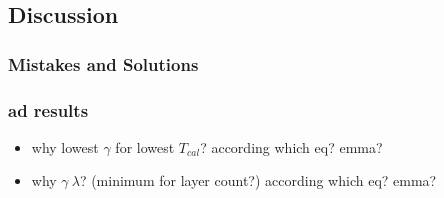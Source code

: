 \subsection{Discussion}
\subsubsection{Mistakes and Solutions}
\subsubsection{ad results}
\begin{itemize}
    \item why lowest $\gamma$ for lowest $T_{cal}$? according which eq? emma? 
    \item why $\gamma ~ \lambda$? (minimum for layer count?) according which eq? emma? 
\end{itemize}

